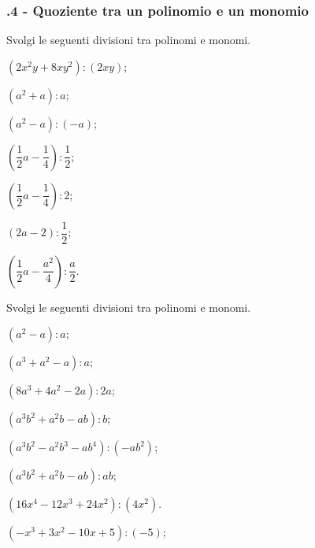 \subsubsection*{\thechapter.4 - Quoziente tra un polinomio e un monomio}
\begin{esercizio}
\label{ese:11.20} %
 Svolgi le seguenti divisioni tra polinomi e monomi.
 \begin{multicols}{2}
\begin{enumeratea}
 \item $\left(2x^{2}y+8{xy}^{2}\right):\left(2{xy}\right)$;
 \item $\left(a^{2}+a\right):a$;
 \item $\left(a^{2}-a\right):(-a)$;
 \item $\left(\dfrac{1}{2}a-\dfrac{1}{4}\right):\dfrac{1}{2}$;
 \item $\left(\dfrac{1}{2}a-\dfrac{1}{4}\right):2$;
 \item $(2a-2):\dfrac{1}{2}$;
 \item $\left(\dfrac{1}{2}a-\dfrac{a^{2}}{4}\right):\dfrac{a}{2}$.
\end{enumeratea}
\end{multicols}
\end{esercizio}

\begin{esercizio}
\label{ese:11.21} %
 Svolgi le seguenti divisioni tra polinomi e monomi.
 \begin{multicols}{2}
\begin{enumeratea}
 \item $\left(a^{2}-a\right):a$;
 \item $\left(a^{3}+a^{2}-a\right):a$;
 \item $\left(8a^{3}+4a^{2}-2a\right):2a$;
 \item $\left(a^{3}b^{2}+a^{2}b-ab\right):b$;
 \item $\left(a^{3}b^{2}-a^{2}b^{3}-ab^{4}\right):(-{ab}^{2})$;
 \item $\left(a^{3}b^{2}+a^{2}b-ab\right):ab$;
 \item $\left(16x^{4}-12x^{3}+24x^{2}\right):\left(4x^{2}\right)$.
 \item $\left(-x^{3}+3x^{2}-10x+5\right):(-5)$;
\end{enumeratea}
\end{multicols}
\end{esercizio}

